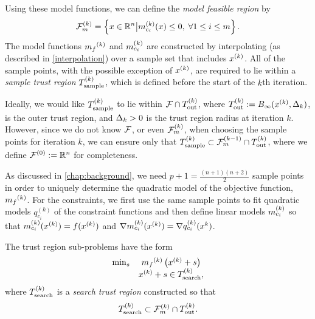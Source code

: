%


Using these model functions, we can define the {\em model feasible region} by
\begin{align}
{\mathcal F_m^{(k)}} = \left\{x \in \mathbb R^n \big| {{m}^{(k)}_{c_i}}(x) \le 0, \; \forall 1 \le i \le m \right\}.
\end{align}
The model functions ${{m}_f}^{(k)}$ and ${{m}^{(k)}_{c_i}}$ are constructed by interpolating (as described in \cref{interpolation}) over a sample set 
that includes $x^{(k)}$.   All of the sample points,  with the possible exception of $x^{(k)}$, are required to lie within a  {\em sample trust region}
${T_{\text{sample}}^{(k)}}$, which is defined before the start of the $k$th iteration.  

Ideally,  we would like ${T_{\text{sample}}^{(k)}}$  to lie within ${\mathcal F} \cap {T_{\text{out}}^{(k)}}$, 
where ${T_{\text{out}}^{(k)}} := B_\infty(x^{(k)},\Delta_k)$,  is the outer trust region, and $\Delta_k>0$ is the trust region radius at iteration $k$.
However, since we do not know ${\mathcal F}$,  or even ${\mathcal F_m^{(k)}}$, when choosing the sample points for iteration $k$, 
we can ensure only that ${T_{\text{sample}}^{(k)}} \subset \mathcal{F}^{(k-1)}_m \cap {T_{\text{out}}^{(k)}}$, where we define $\mathcal{F}^{(0)} := \mathbb R^n$ for completeness.

As discussed in \cref{chap:background}, we need 
 $p+1 = \frac{(n+1)(n+2)}{2}$ sample points in order to uniquely determine the quadratic model of the objective function, ${{m}_f}^{(k)}$.
 For the constraints, we first use the same sample points to fit quadratic models $q_{c_i}^{(k)}$ of the constraint functions and then define  
 linear models ${{m}^{(k)}_{c_i}}$ so that ${{m}^{(k)}_{c_i}}(x^{(k)})=f(x^{(k)})$ and $\nabla {{m}^{(k)}_{c_i}}(x^{(k)}) = \nabla q_{c_i}^{(k)}(x^k)$.   
 
The trust region sub-problems have the form
\begin{align*} \label{trust_problem_nlp}
\begin{array}{ccl} \min_{s}
 & {{m}_f}^{(k)} \left(x^{(k)}+s\right) \\
 & x^{(k)}+s \in {T_{\text{search}}^{(k)}},
 \end{array}
\end{align*}
where ${T_{\text{search}}^{(k)}}$ is a {\em search trust region} constructed so that 
\[ {T_{\text{search}}^{(k)}} \subset {\mathcal F_m^{(k)}} \cap {T_{\text{out}}^{(k)}}.\] 

